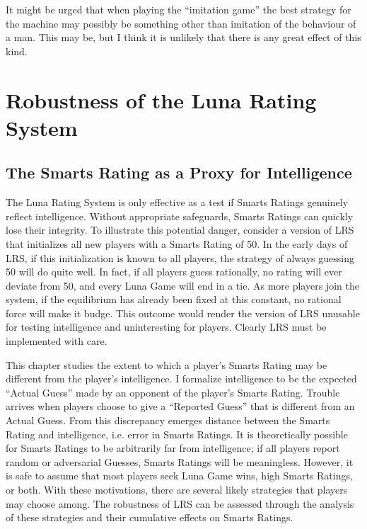 \begin{savequote}[75mm]
It might be urged that when playing the ``imitation game'' the best strategy for the machine may possibly be something other than imitation of the behaviour of a man. This may be, but I think it is unlikely that there is any great effect of this kind.
\end{savequote}

\chapter{Robustness of the Luna Rating System}

\section{The Smarts Rating as a Proxy for Intelligence}

The Luna Rating System is only effective as a test if Smarts Ratings genuinely reflect intelligence. Without appropriate safeguards, Smarts Ratings can quickly lose their integrity. To illustrate this potential danger, consider a version of LRS that initializes all new players with a Smarts Rating of 50. In the early days of LRS, if this initialization is known to all players, the strategy of always guessing 50 will do quite well. In fact, if all players guess rationally, no rating will ever deviate from 50, and every Luna Game will end in a tie. As more players join the system, if the equilibrium has already been fixed at this constant, no rational force will make it budge. This outcome would render the version of LRS unusable for testing intelligence and uninteresting for players. Clearly LRS must be implemented with care.

This chapter studies the extent to which a player's Smarts Rating may be different from the player's intelligence. I formalize intelligence to be the expected ``Actual Guess'' made by an opponent of the player's Smarts Rating. Trouble arrives when players choose to give a ``Reported Guess'' that is different from an Actual Guess. From this discrepancy emerges distance between the Smarts Rating and intelligence, i.e. error in Smarts Ratings. It is theoretically possible for Smarts Ratings to be arbitrarily far from intelligence; if all players report random or adversarial Guesses, Smarts Ratings will be meaningless. However, it is safe to assume that most players seek Luna Game wins, high Smarts Ratings, or both. With these motivations, there are several likely strategies that players may choose among. The robustness of LRS can be assessed through the analysis of these strategies and their cumulative effects on Smarts Ratings.

